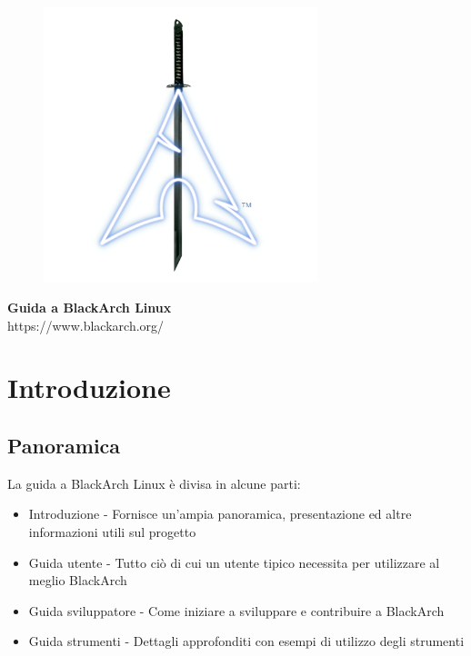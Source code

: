 \documentclass[a4paper, oneside, 11pt]{book}
\begin{document}
\pagestyle{empty}
\begin{center}
\begin{figure}[htbp]
\centering
\vspace{0.5cm}
\includegraphics[width=8cm]{images/logo.png}
\label{fig:logo}
\end{figure}
\vspace{0.5cm}
\Huge{\textbf{Guida a BlackArch Linux}}\\
\vspace{1cm}
\Large{\color{red}https://www.blackarch.org/}\\
\vspace{0.5cm}
\end{center}
\newpage
\tableofcontents
\newpage
\pagestyle{fancy}


\chapter{Introduzione}

\section{Panoramica}
La guida a BlackArch Linux è divisa in alcune parti:
\begin{itemize}
\item Introduzione - Fornisce un'ampia panoramica, presentazione ed altre informazioni utili sul progetto
\item Guida utente - Tutto ciò di cui un utente tipico necessita per utilizzare al meglio BlackArch
\item Guida sviluppatore - Come iniziare a sviluppare e contribuire a BlackArch
\item Guida strumenti - Dettagli approfonditi con esempi di utilizzo degli strumenti
\end{itemize}
\end{document}
